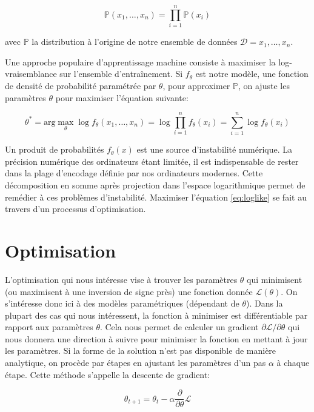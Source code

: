 \begin{equation}
\mathbb{P}(x_{1}, \dots, x_{n}) = \prod_{i=1}^{n}\mathbb{P}(x_{i})
\end{equation}

avec $\mathbb{P}$ la distribution à l'origine de notre ensemble de données $\mathcal{D}={x_1,\dots,x_n}$.

Une approche populaire d'apprentissage machine consiste à maximiser la
log-vraisemblance sur l'ensemble d'entraînement.  Si $f_{\theta}$ est notre
modèle, une fonction de densité de probabilité paramétrée par $\theta$, pour
approximer $\mathbb{P}$, on ajuste les paramètres $\theta$ pour maximiser
l'équation suivante:

\begin{equation}
\label{eq:loglike}
\theta^{*}=\textrm{arg}\max_{\theta} \log f_{\theta}(x_{1}, \dots, x_{n}) = \log \prod_{i=1}^{n}f_{\theta}(x_{i}) = \sum_{i=1}^{n}\log f_{\theta}(x_{i})
\end{equation}

Un produit de probabilités $f_{\theta}(x)$ est une source
d'instabilité numérique. La précision numérique des ordinateurs étant limitée,
il est indispensable de rester dans la plage d'encodage définie par nos
ordinateurs modernes. Cette décomposition en somme après projection dans
l'espace logarithmique permet de remédier à ces problèmes d'instabilité.
Maximiser l'équation \ref{eq:loglike} se fait au travers d'un processus
d'optimisation. 
 
\section{Optimisation}

L'optimisation qui nous intéresse vise à trouver les paramètres $\theta$ qui
minimisent (ou maximisent à une inversion de signe près) une fonction donnée
$\mathcal{L}(\theta)$.  On s'intéresse donc ici à des modèles paramétriques
(dépendant de $\theta$). Dans la plupart des cas qui nous intéressent, la fonction à minimiser est
différentiable par rapport aux paramètres $\theta$.  Cela nous permet de
calculer un gradient $\partial \mathcal{L}/\partial\theta$ qui nous donnera une
direction à suivre pour minimiser la fonction en mettant à jour les paramètres. Si la forme de la solution n'est
pas disponible de manière analytique, on procède par étapes en ajustant les
paramètres d'un pas $\alpha$ à chaque étape. Cette méthode s'appelle la
descente de gradient:

\begin{equation}
\theta_{t+1} = \theta_{t} - \alpha \dfrac{\partial}{\partial\theta} \mathcal{L}
\end{equation}


